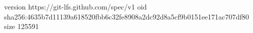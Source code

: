version https://git-lfs.github.com/spec/v1
oid sha256:4635b7d11139a618520fbb6c32fe8908a2dc92d8a5cf9b0151ee171ac707df80
size 125591
